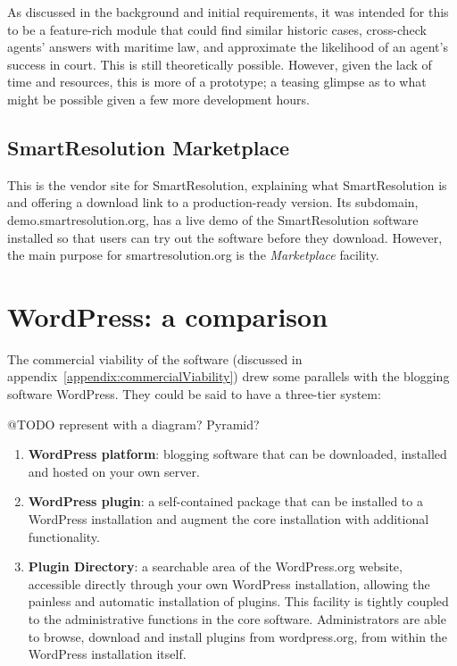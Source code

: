 As discussed in the background and initial requirements, it was intended for this to be a feature-rich module that could find similar historic cases, cross-check agents' answers with maritime law, and approximate the likelihood of an agent's success in court. This is still theoretically possible. However, given the lack of time and resources, this is more of a prototype; a teasing glimpse as to what might be possible given a few more development hours.

\subsection{SmartResolution Marketplace}

This is the vendor site for SmartResolution, explaining what SmartResolution is and offering a download link to a production-ready version. Its subdomain, demo.smartresolution.org, has a live demo of the SmartResolution software installed so that users can try out the software before they download. However, the main purpose for smartresolution.org is the \emph{Marketplace} facility.

\section{WordPress: a comparison}

The commercial viability of the software (discussed in appendix~\ref{appendix:commercialViability}) drew some parallels with the blogging software WordPress. They could be said to have a three-tier system:

@TODO represent with a diagram? Pyramid?

\begin{enumerate}
    \item \textbf{WordPress platform}: blogging software that can be downloaded, installed and hosted on your own server.
    
    \item \textbf{WordPress plugin}: a self-contained package that can be installed to a WordPress installation and augment the core installation with additional functionality.
    
    \item \textbf{Plugin Directory}: a searchable area of the WordPress.org website, accessible directly through your own WordPress installation, allowing the painless and automatic installation of plugins. This facility is tightly coupled to the administrative functions in the core software. Administrators are able to browse, download and install plugins from wordpress.org, from within the WordPress installation itself. %
\end{enumerate}

